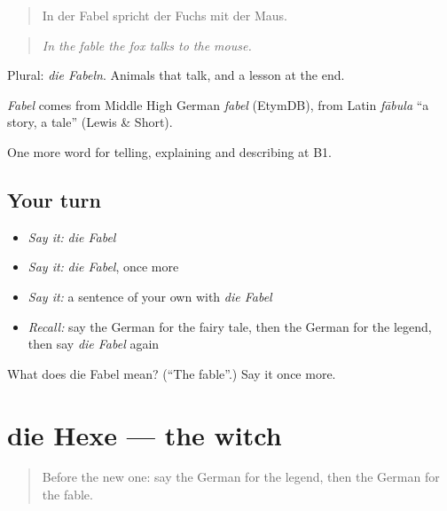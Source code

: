 \begin{quote}
In der Fabel spricht der Fuchs mit der Maus.
\end{quote}

\begin{quote}
\emph{In the fable the fox talks to the mouse.}
\end{quote}

Plural: \emph{die Fabeln}. Animals that talk, and a lesson at the end.

\begin{cousinweb}
\emph{Fabel} comes from Middle High German \emph{fabel} (EtymDB), from Latin \emph{fābula} \textquotedblleft{}a story, a tale\textquotedblright{} (Lewis \& Short).
\end{cousinweb}

\begin{grammarlens}[title={What you've built}]
One more word for telling, explaining and describing at B1.
\end{grammarlens}

\subsection*{Your turn}
\begin{itemize}
\raggedright
  \item \emph{Say it:} \emph{die Fabel}
  \item \emph{Say it:} \emph{die Fabel}, once more
  \item \emph{Say it:} a sentence of your own with \emph{die Fabel}
  \item \emph{Recall:} say the German for the fairy tale, then the German for the legend, then say \emph{die Fabel} again
\end{itemize}

\begin{tcolorbox}[breakable,colback=teal!4,colframe=teal!35!black,title={Before you move on}]
What does die Fabel mean? (\textquotedblleft{}The fable\textquotedblright{}.) Say it once more.
\end{tcolorbox}
\section[die Hexe]{die Hexe — the witch}

\label{lesson:GE-C313-hexe}



\begin{quote}
Before the new one: say the German for the legend, then the German for the fable.
\end{quote}

